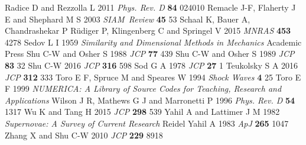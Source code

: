 \documentclass[letterpaper]{jpconf}
\begin{document}
\begin{thebibliography}{34}
   Radice D and Rezzolla L 2011 {\it Phys. Rev. D} {\bf 84} 024010
   Remacle J-F, Flaherty J E and Shephard M S 2003 {\it SIAM~Review} {\bf 45} 53
   Schaal K, Bauer A, Chandrashekar P R{\"u}diger P, Klingenberg C and Springel V 2015 {\it MNRAS} {\bf 453} 4278
   Sedov L I 1959 {\it Similarity and Dimensional Methods in Mechanics} Academic Press
   Shu C-W and Osher S 1988 {\it JCP} {\bf 77} 439
   Shu C-W and Osher S 1989 {\it JCP} {\bf 83} 32
   Shu C-W 2016 {\it JCP} {\bf 316} 598
   Sod G A 1978 {\it JCP} {\bf 27} 1
   Teukolsky S A 2016 {\it JCP} {\bf 312} 333
   Toro E F, Spruce M and Speares W 1994 {\it Shock Waves} {\bf 4} 25
   Toro E F 1999 {\it NUMERICA: A Library of Source Codes for Teaching, Research and Applications}
   Wilson J R, Mathews G J and Marronetti P 1996 {\it Phys. Rev. D} {\bf 54} 1317
   Wu K and Tang H 2015 {\it JCP} {\bf 298} 539
   Yahil A and Lattimer J M 1982 {\it Supernovae: A Survey of Current Research} Reidel
   Yahil A 1983 {\it ApJ} {\bf 265} 1047
   Zhang X and Shu C-W 2010 {\it JCP} {\bf 229} 8918
\end{thebibliography}
\end{document}
